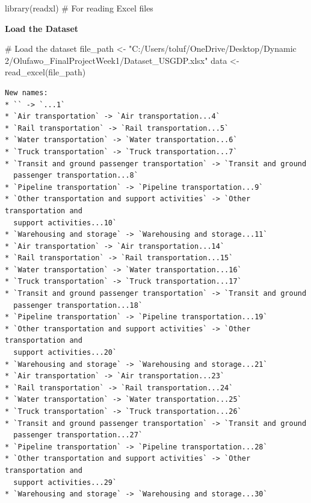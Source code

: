 \documentclass[
  letterpaper,
  DIV=11,
  numbers=noendperiod]{scrreprt}
\newenvironment{Shaded}{\begin{snugshade}}{\end{snugshade}}
\newcommand{\CommentTok}[1]{\textcolor[rgb]{0.37,0.37,0.37}{#1}}
\newcommand{\FunctionTok}[1]{\textcolor[rgb]{0.28,0.35,0.67}{#1}}
\newcommand{\NormalTok}[1]{\textcolor[rgb]{0.00,0.23,0.31}{#1}}
\newcommand{\OtherTok}[1]{\textcolor[rgb]{0.00,0.23,0.31}{#1}}
\newcommand{\StringTok}[1]{\textcolor[rgb]{0.13,0.47,0.30}{#1}}
\begin{document}
\begin{Shaded}
\begin{Highlighting}[]
\FunctionTok{library}\NormalTok{(readxl)  }\CommentTok{\# For reading Excel files}
\end{Highlighting}
\end{Shaded}

\textbf{Load the Dataset}

\begin{Shaded}
\begin{Highlighting}[]
\CommentTok{\# Load the dataset}
\NormalTok{file\_path }\OtherTok{\textless{}{-}} \StringTok{"C:/Users/toluf/OneDrive/Desktop/Dynamic 2/Olufawo\_FinalProjectWeek1/Dataset\_USGDP.xlsx"}
\NormalTok{data }\OtherTok{\textless{}{-}} \FunctionTok{read\_excel}\NormalTok{(file\_path)}
\end{Highlighting}
\end{Shaded}

\begin{verbatim}
New names:
* `` -> `...1`
* `Air transportation` -> `Air transportation...4`
* `Rail transportation` -> `Rail transportation...5`
* `Water transportation` -> `Water transportation...6`
* `Truck transportation` -> `Truck transportation...7`
* `Transit and ground passenger transportation` -> `Transit and ground
  passenger transportation...8`
* `Pipeline transportation` -> `Pipeline transportation...9`
* `Other transportation and support activities` -> `Other transportation and
  support activities...10`
* `Warehousing and storage` -> `Warehousing and storage...11`
* `Air transportation` -> `Air transportation...14`
* `Rail transportation` -> `Rail transportation...15`
* `Water transportation` -> `Water transportation...16`
* `Truck transportation` -> `Truck transportation...17`
* `Transit and ground passenger transportation` -> `Transit and ground
  passenger transportation...18`
* `Pipeline transportation` -> `Pipeline transportation...19`
* `Other transportation and support activities` -> `Other transportation and
  support activities...20`
* `Warehousing and storage` -> `Warehousing and storage...21`
* `Air transportation` -> `Air transportation...23`
* `Rail transportation` -> `Rail transportation...24`
* `Water transportation` -> `Water transportation...25`
* `Truck transportation` -> `Truck transportation...26`
* `Transit and ground passenger transportation` -> `Transit and ground
  passenger transportation...27`
* `Pipeline transportation` -> `Pipeline transportation...28`
* `Other transportation and support activities` -> `Other transportation and
  support activities...29`
* `Warehousing and storage` -> `Warehousing and storage...30`
\end{verbatim}
\end{document}
